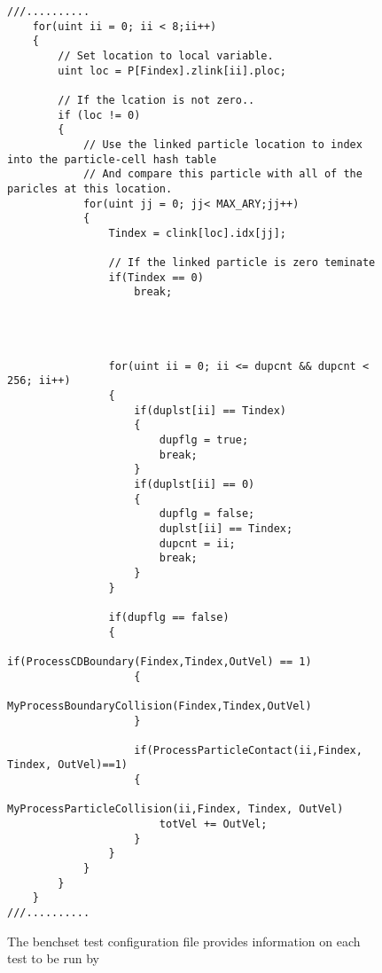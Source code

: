 
\begin{figure}[h]
\centering
\lstset{style=gpucode,linewidth=6.5in,xleftmargin=0.25in}

\begin{lstlisting}
///..........
	for(uint ii = 0; ii < 8;ii++)
	{
		// Set location to local variable.
		uint loc = P[Findex].zlink[ii].ploc;

		// If the lcation is not zero..
		if (loc != 0)
		{
			// Use the linked particle location to index into the particle-cell hash table 
			// And compare this particle with all of the paricles at this location.
			for(uint jj = 0; jj< MAX_ARY;jj++)
			{
				Tindex = clink[loc].idx[jj];

				// If the linked particle is zero teminate
				if(Tindex == 0)
					break;
				
				
					
				
				for(uint ii = 0; ii <= dupcnt && dupcnt < 256; ii++)
				{
					if(duplst[ii] == Tindex)
					{
						dupflg = true;
						break;
					}
					if(duplst[ii] == 0)
					{
						dupflg = false;
						duplst[ii] == Tindex;
						dupcnt = ii;
						break;
					}
				}
										
				if(dupflg == false)						
				{
					if(ProcessCDBoundary(Findex,Tindex,OutVel) == 1)
					{
						MyProcessBoundaryCollision(Findex,Tindex,OutVel)
					}
				
					if(ProcessParticleContact(ii,Findex, Tindex, OutVel)==1)
					{
						MyProcessParticleCollision(ii,Findex, Tindex, OutVel)
						totVel += OutVel;
					}
				}
			}
		}
	}
///..........
\end{lstlisting}


\caption[Benchset test configuration file]{The benchset test configuration file provides information on each test to be run by \app{} }
\label{fig:ParticleComp}
\end{figure}
